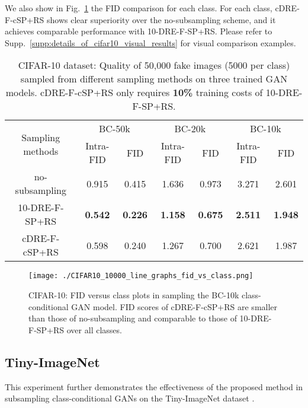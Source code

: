 \documentclass[10pt, twocolumn]{article}
\theoremstyle{definition}
\begin{document}
We also show in Fig.~\ref{fig:FID_vs_class_CIFAR10} the FID comparison for each class. For each class, cDRE-F-cSP+RS shows clear superiority over the no-subsampling scheme, and it achieves comparable performance with 10-DRE-F-SP+RS. Please refer to Supp.\ \ref{supp:details_of_cifar10_visual_results} for visual comparison examples. 



\begin{table}[htb]
	\caption{CIFAR-10 dataset: Quality of 50,000 fake images (5000 per class) sampled from different sampling methods on three trained GAN models. cDRE-F-cSP+RS only requires \textbf{10\%} training costs of 10-DRE-F-SP+RS.  }
	\centering
	\begin{adjustbox}{width=0.48\textwidth}
		\begin{tabular}{c|c|c|c|c|c|c}
			\toprule
			\multirow{2}{*}{Sampling methods} & \multicolumn{2}{c|}{BC-50k} & \multicolumn{2}{c|}{BC-20k} & \multicolumn{2}{c}{BC-10k} \\ \cline{2-7} 
			& Intra-FID      & FID        & Intra-FID      & FID        & Intra-FID      & FID       \\ \hline
			no-subsampling                    & 0.915          & 0.415      & 1.636          & 0.973      & 3.271          & 2.601     \\ \hline
			10-DRE-F-SP+RS                    & \textbf{0.542}          & \textbf{0.226}      & \textbf{1.158}          & \textbf{0.675}      & \textbf{2.511}          & \textbf{1.948}     \\ \hline
			cDRE-F-cSP+RS                      & 0.598          & 0.240      & 1.267          & 0.700      & 2.621          & 1.987     \\ 
			\bottomrule
		\end{tabular}
	\end{adjustbox}
	\label{tab:cifar10_compare}
\end{table}


\begin{figure}[!htbp]
	\centering
	\texttt{[image: ./CIFAR10\_10000\_line\_graphs\_fid\_vs\_class.png]} \caption{CIFAR-10: FID versus class plots in sampling the BC-10k class-conditional GAN model. FID scores of cDRE-F-cSP+RS are smaller than those of no-subsampling and comparable to those of 10-DRE-F-SP+RS over all classes. }
	\label{fig:FID_vs_class_CIFAR10}
\end{figure}


\subsection{Tiny-ImageNet}\label{sec:exp_tiny_imagenet}
This experiment further demonstrates the effectiveness of the proposed method in subsampling class-conditional GANs on the Tiny-ImageNet dataset \cite{Le2015TinyIV}.  
\end{document}
